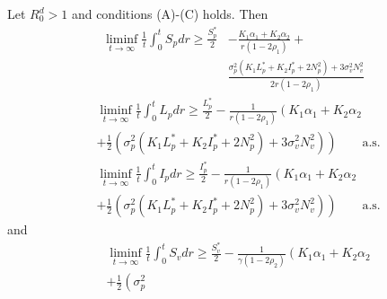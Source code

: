 \begin{theorem}
 	\label{Lower_Bound}
 	Let $R^d_0>1$ and conditions (A)-(C) holds. Then
 	\begin{equation}
 		\begin{aligned}
			\liminf_{t \to \infty}
			\frac{1}{t}
			\int_0 ^ t S_p dr 
			\geq  
			\frac{S_p ^* }{2} 
			&-
			 	\frac{
			 		K_1 \alpha_1 + 
			 		K_2 \alpha_2
			 	}{ r (1 - 2 \rho_1)} +
			\\
			&
				\frac{
			 		\sigma_p ^ 2 
			 		\left(
			 			K_1 L_p ^ * + 
			 			K_2 I_p ^* + 2N_p ^ 2
			 		\right) + 
			 		3 \sigma_v ^ 2 N_v^2
				}{2 r (1 - 2 \rho_1)}
		\end{aligned}
	\end{equation}
%
	\begin{equation}
	 	\begin{aligned}
	 		&\liminf_{t\to \infty}
 				\frac{1}{t}
 				\int_0^t
 					L_p dr
 				\geq 
 				\frac{L_p^*}{2} - 
 				\frac{1}{ r(1 - 2 \rho_1)}
 				\left( 
 					K_1 \alpha_1 + 
 					K_2 \alpha_2
 				\right.\\
	 		&+
 			\left.
 				\frac{1}{2}
 				\left(
 					\sigma_p ^ 2
 					\left(
 						K_1 L_p ^* + 
 						K_2 I_p ^* + 2N_p ^ 2
 					\right) + 
 					3 \sigma_v ^ 2 
 					N_v ^ 2
 				\right)
 			\right) \qquad \mbox{a.s.}
 	\end{aligned}
 \end{equation}
%
 \begin{equation}
 	\begin{aligned}
 		&
 		\liminf_{t\to \infty}
 			\frac{1}{t}
 			\int_0 ^ t I_p dr
 			\geq 
 			\frac{I_p ^ *}{2} - 
 			\frac{1}{r (1 - 2 \rho_1)}
 			\left(
 				K_1 \alpha_1 + 
 				K_2\alpha_2
 			\right.\\
 		&+
 			\left.
	 			\frac{1}{2}
	 			\left(
	 				\sigma_p ^ 2
	 				\left(
	 					K_1 L_p ^* + 
	 					K_2 I_p ^* + 
	 					2N_p ^ 2
	 				\right) + 
	 				3 \sigma_v^2 N_v^2
	 			\right)
 			\right)
 			\qquad \mbox{a.s.}
 		\end{aligned}
 	\end{equation}
%
and
	\begin{equation}
		\begin{aligned}
			&
				\liminf\limits_{t \to \infty}
				\frac{1}{t}
				\int_{0} ^ {t} S_v dr
			 	\geq
			 	\frac{S_v^*}{2} - 
			 	\frac{1}{\gamma(1 - 2 \rho_2)}
			 	\left(
			 		K_1 \alpha_1 + 
			 		K_2 \alpha_2
			 	\right.\\
 			&+
 				\left.
 					\frac{1}{2}
 					\left(
 						\sigma_p ^ 2

\end{aligned}
\end{equation}
\end{theorem}
